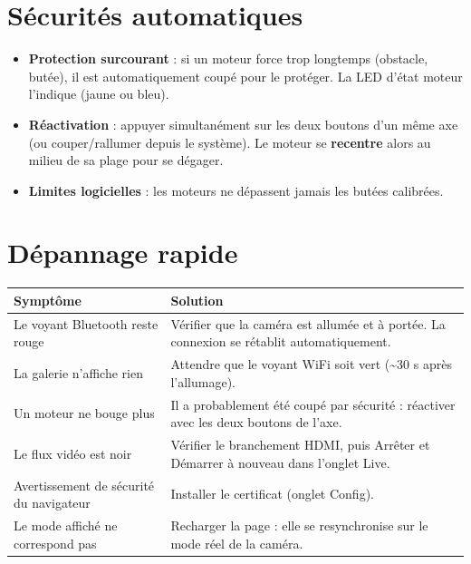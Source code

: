 \documentclass[11pt,a4paper]{article}
\begin{document}
\section{Sécurités automatiques}

\begin{itemize}[leftmargin=*]
  \item \textbf{Protection surcourant} : si un moteur force trop longtemps
        (obstacle, butée), il est automatiquement coupé pour le protéger. La LED
        d'état moteur l'indique (jaune ou bleu).
  \item \textbf{Réactivation} : appuyer simultanément sur les deux boutons d'un
        même axe (ou couper/rallumer depuis le système). Le moteur se
        \textbf{recentre} alors au milieu de sa plage pour se dégager.
  \item \textbf{Limites logicielles} : les moteurs ne dépassent jamais les butées
        calibrées.
\end{itemize}

\section{Dépannage rapide}

\begin{center}
\begin{tabular}{>{\raggedright}p{6cm} p{8cm}}
\toprule
\textbf{Symptôme} & \textbf{Solution} \\
\midrule
Le voyant Bluetooth reste rouge & Vérifier que la caméra est allumée et à portée. La connexion se rétablit automatiquement. \\
La galerie n'affiche rien & Attendre que le voyant WiFi soit vert (\textasciitilde30 s après l'allumage). \\
Un moteur ne bouge plus & Il a probablement été coupé par sécurité : réactiver avec les deux boutons de l'axe. \\
Le flux vidéo est noir & Vérifier le branchement HDMI, puis Arrêter et Démarrer à nouveau dans l'onglet Live. \\
Avertissement de sécurité du navigateur & Installer le certificat (onglet Config). \\
Le mode affiché ne correspond pas & Recharger la page : elle se resynchronise sur le mode réel de la caméra. \\
\bottomrule
\end{tabular}
\end{center}
\end{document}
